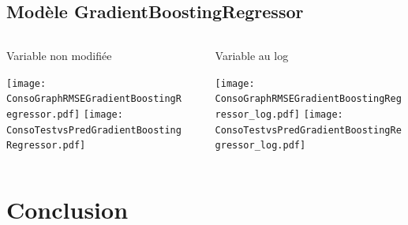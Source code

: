 \documentclass[8pt,aspectratio=169,hyperref={unicode=true}]{beamer}
\begin{document}
\subsection{Modèle GradientBoostingRegressor}
\begin{frame}[t]{\insertsubsection}
  \begin{columns}
    \begin{column}{.33\textwidth}
      {\centering Variable non modifiée

      }
      \texttt{[image: ConsoGraphRMSEGradientBoostingRegressor.pdf]}
      \texttt{[image: ConsoTestvsPredGradientBoostingRegressor.pdf]}
    \end{column}
    \begin{column}{.33\textwidth}

    \end{column}
    \begin{column}{.33\textwidth}
      {\centering Variable au log

      }
      \texttt{[image: ConsoGraphRMSEGradientBoostingRegressor\_log.pdf]}
      \texttt{[image: ConsoTestvsPredGradientBoostingRegressor\_log.pdf]}
    \end{column}
  \end{columns}
\end{frame}

\section{Conclusion}
\begin{frame}{\insertsection}

\end{frame}
\end{document}
